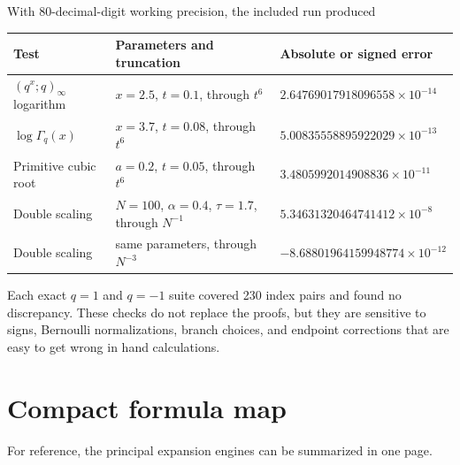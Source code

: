 \documentclass[11pt,oneside]{article}
\theoremstyle{definition}
\theoremstyle{remark}
\let\reporttopsection\section
\let\reportsubsection\subsection
\let\chapter\reporttopsection
\let\section\reportsubsection
\begin{document}
With 80-decimal-digit working precision, the included run produced
\begin{center}\small
\begin{tabularx}{\textwidth}{@{}>{\raggedright\arraybackslash}p{}
  >{\raggedright\arraybackslash}p{}
  >{\raggedright\arraybackslash}X@{}}
\toprule
Test & Parameters and truncation & Absolute or signed error\\
\midrule
$(q^x;q)_\infty$ logarithm
 & $x=2.5$, $t=0.1$, through $t^6$
 & $2.64769017918096558\times10^{-14}$\\
$\log\Gamma_q(x)$
 & $x=3.7$, $t=0.08$, through $t^6$
 & $5.00835558895922029\times10^{-13}$\\
Primitive cubic root
 & $a=0.2$, $t=0.05$, through $t^6$
 & $3.4805992014908836\times10^{-11}$\\
Double scaling
 & $N=100$, $\alpha=0.4$, $\tau=1.7$, through $N^{-1}$
 & $5.34631320464741412\times10^{-8}$\\
Double scaling
 & same parameters, through $N^{-3}$
 & $-8.68801964159948774\times10^{-12}$\\
\bottomrule
\end{tabularx}
\end{center}
Each exact $q=1$ and $q=-1$ suite covered 230 index pairs and found no
discrepancy.  These checks do not replace the proofs, but they are sensitive to
signs, Bernoulli
normalizations, branch choices, and endpoint corrections that are easy to get
wrong in hand calculations.

\chapter{Compact formula map}\label{app:formula-map}

For reference, the principal expansion engines can be summarized in one page.
\end{document}

